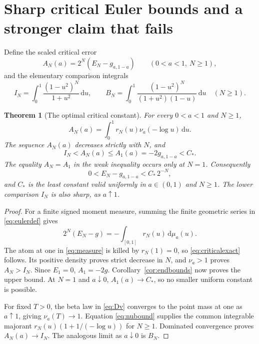 \documentclass[11pt]{article}
\numberwithin{equation}{section}
\newtheorem{theorem}{Theorem}[section]
\theoremstyle{definition}\newtheorem{definition}[theorem]{Definition}
\theoremstyle{remark}\newtheorem{remark}[theorem]{Remark}
\newcommand{\dd}{\,\mathrm d}
\newcommand{\CC}{C_*}
\begin{document}
\section{Sharp critical Euler bounds and a stronger claim that fails}
\label{sec:criticalerror}
Define the scaled critical error
\begin{equation}\label{eq:AN}
 A_N(a)=2^N(E_N-g_{a,1-a})\qquad(0<a<1,\ N\ge1),
\end{equation}
and the elementary comparison integrals
\begin{equation}\label{eq:IN}
 I_N=\int_0^1\frac{(1-u^2)^N}{1+u^2}\dd u,\qquad
 B_N=\int_0^1\frac{(1-u^2)^N}{(1+u^2)(1-u)}\dd u\quad(N\ge1).
\end{equation}

\begin{theorem}[The optimal critical constant]\label{thm:sharpconstant}
For every $0<a<1$ and $N\ge1$,
\begin{equation}\label{eq:criticalexact}
 A_N(a)=\int_0^1r_N(u)\nu_a(-\log u)\dd u.
\end{equation}
The sequence $A_N(a)$ decreases strictly with $N$, and
\begin{equation}\label{eq:sharpsandwich}
 I_N<A_N(a)\le A_1(a)=-2g_{a,1-a}<\CC.
\end{equation}
The equality $A_N=A_1$ in the weak inequality occurs only at $N=1$.
Consequently
\begin{equation}\label{eq:sharpEuler}
 0<E_N-g_{a,1-a}<\CC\,2^{-N},
\end{equation}
and $\CC$ is the least constant valid uniformly in $a\in(0,1)$ and
$N\ge1$. The lower comparison $I_N$ is also sharp, as $a\uparrow1$.
\end{theorem}
\begin{proof}
For a finite signed moment measure, summing the finite geometric series
in \eqref{eq:eulerdef} gives
\[
 2^N(E_N-g)=-\int_{[0,1]}r_N(u)\dd\mu_a(u).
\]
The atom at one in \eqref{eq:measure} is killed by $r_N(1)=0$, so
\eqref{eq:criticalexact} follows. Its positive density proves strict
decrease in $N$, and $\nu_a>1$ proves $A_N>I_N$. Since $E_1=0$,
$A_1=-2g$. Corollary~\ref{cor:endbounds} now proves the upper bound.
At $N=1$ and $a\downarrow0$, $A_1(a)\to\CC$, so no smaller
uniform constant is possible.

For fixed $T>0$, the beta law in \eqref{eq:Dv} converges to the point
mass at one as $a\uparrow1$, giving $\nu_a(T)\to1$. Equation
\eqref{eq:nubound} supplies the common integrable majorant
$r_N(u)(1+1/(-\log u))$ for $N\ge1$. Dominated convergence proves
$A_N(a)\to I_N$. The analogous limit as $a\downarrow0$ is $B_N$.
\end{proof}
\end{document}
